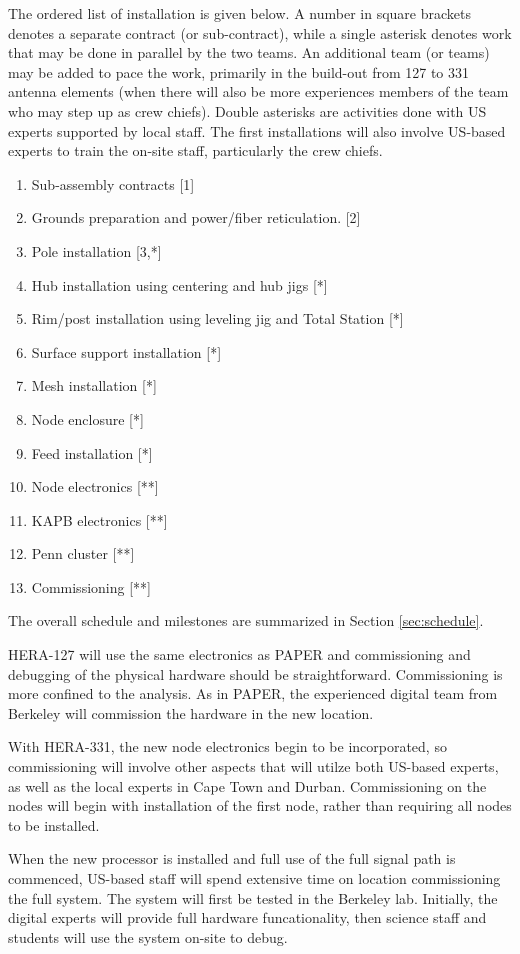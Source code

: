 \documentclass[preprint]{aastex}
\begin{document}
The ordered list of installation is given below. A number in square brackets denotes
a separate contract (or sub-contract), while a single asterisk denotes work that may
be done in parallel by the two teams. An additional team (or teams) may be added to
pace the work, primarily in the build-out from 127 to 331 antenna elements (when there will also be more
experiences members of the team who may step up as crew chiefs). Double asterisks are
activities done with US experts supported by local staff. The first installations
will also involve US-based experts to train the on-site staff, particularly the crew
chiefs.
\begin{enumerate}[itemsep=-3pt]
\item Sub-assembly contracts [1]
\item Grounds preparation and power/fiber reticulation. [2]
\item Pole installation [3,*]
\item Hub installation using centering and hub jigs  [*]
\item Rim/post installation using leveling jig and Total Station [*]
\item Surface support installation [*]
\item Mesh installation [*]
\item Node enclosure [*]
\item Feed installation [*]
\item Node electronics [**]
\item KAPB electronics [**]
\item Penn cluster [**]
\item Commissioning [**]
\end{enumerate}
The overall schedule and milestones are summarized in Section \ref{sec:schedule}.

HERA-127 will use the same electronics as PAPER and commissioning and debugging of the physical
hardware should be straightforward.  Commissioning is more confined to the analysis.  As in PAPER,
the experienced digital team from Berkeley will commission the hardware in the new location.

With HERA-331, the new node electronics begin to be incorporated, so commissioning will involve
other aspects that will utilze both US-based experts, as well as the local experts in Cape Town and Durban.
Commissioning on the nodes will begin with installation of the first node, rather than requiring all nodes
to be installed.

When the new processor is installed and full use of the full signal path is commenced, US-based staff
will spend extensive time on location commissioning the full system.  The system will first be tested in the Berkeley lab.  
Initially, the digital experts will provide full hardware funcationality, then science staff and students will use the system on-site to debug.
\end{document}
